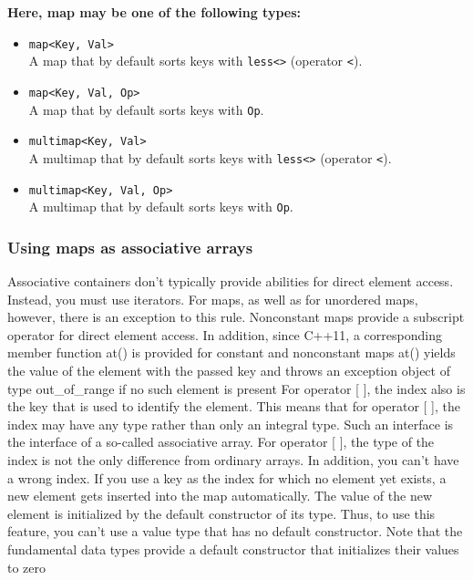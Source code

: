 \documentclass{report}
\begin{document}
\textbf{Here, map may be one of the following types:}
\begin{itemize}
    \item \texttt{map<Key, Val>} \\
    A map that by default sorts keys with \texttt{less<>} (operator \texttt{<}).
    
    \item \texttt{map<Key, Val, Op>} \\
    A map that by default sorts keys with \texttt{Op}.
    
    \item \texttt{multimap<Key, Val>} \\
    A multimap that by default sorts keys with \texttt{less<>} (operator \texttt{<}).
    
    \item \texttt{multimap<Key, Val, Op>} \\
    A multimap that by default sorts keys with \texttt{Op}.
\end{itemize}

\bigbreak \noindent 
\subsubsection{Using maps as associative arrays}
\bigbreak \noindent 
Associative containers don’t typically provide abilities for direct element access. Instead, you must
use iterators. For maps, as well as for unordered maps, however, there is an exception to this rule. Nonconstant maps provide a subscript operator for direct element access. In addition, since C++11, a corresponding member function at() is provided for constant and
nonconstant maps 
\bigbreak \noindent 
at() yields the value of the element with the passed key and throws an exception object of type
out\_of\_range if no such element is present
\bigbreak \noindent 
For operator [ ], the index also is the key that is used to identify the element. This means that
for operator [ ], the index may have any type rather than only an integral type. Such an interface is
the interface of a so-called associative array.
\bigbreak \noindent 
For operator [ ], the type of the index is not the only difference from ordinary arrays. In addition,
you can’t have a wrong index. If you use a key as the index for which no element yet exists, a new
element gets inserted into the map automatically. The value of the new element is initialized by the
default constructor of its type. Thus, to use this feature, you can’t use a value type that has no default
constructor. Note that the fundamental data types provide a default constructor that initializes their
values to zero
\end{document}
